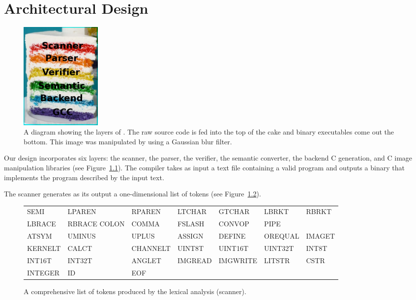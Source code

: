 \chapter{Architectural Design}




\begin{figure}
\begin{center}
\includegraphics[width=40mm]{figures/layers.png}
\caption{A diagram showing the layers of \sys{}. The raw source code is
fed into the top of the cake and binary executables come out the bottom.
This image was manipulated by \sys{} using a Gaussian blur filter.}
\label{fig:layers}
\end{center}
\end{figure}

Our design incorporates six layers: the scanner, the parser, the verifier,
the semantic converter, the backend C generation, and C image manipulation
libraries (see Figure~\ref{fig:layers}). The compiler takes as input
a text file containing a valid \sys{} program and outputs a binary that
implements the program described by the input text.

The scanner generates as its output a one-dimensional list of
tokens (see Figure~\ref{fig:tokens}).

\begin{figure}
\begin{center}
\begin{tabular}{l l l l l l l}

    SEMI & LPAREN & RPAREN & LTCHAR & GTCHAR & LBRKT & RBRKT \\
    LBRACE & RBRACE COLON & COMMA & FSLASH & CONVOP & PIPE \\
    ATSYM & UMINUS & UPLUS & ASSIGN & DEFINE & OREQUAL & IMAGET \\
    KERNELT & CALCT & CHANNELT & UINT8T & UINT16T & UINT32T & INT8T \\
    INT16T & INT32T & ANGLET & IMGREAD & IMGWRITE & LITSTR & CSTR \\
    INTEGER & ID & EOF \\

\end{tabular}
\caption{A comprehensive list of tokens produced by the lexical analysis
(scanner).}
\end{center}
\label{fig:tokens}
\end{figure}

